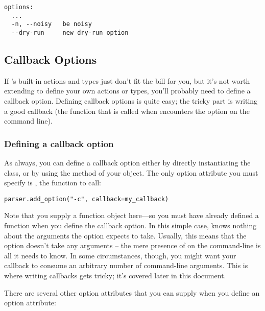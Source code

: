 \begin{verbatim}
options:
  ...
  -n, --noisy   be noisy
  --dry-run     new dry-run option
\end{verbatim}

\subsection{Callback Options\label{optparse-callback-options}}

If 's built-in actions and types just don't fit the
bill for you, but it's not worth extending  to define
your own actions or types, you'll probably need to define a callback
option.  Defining callback options is quite easy; the tricky part is
writing a good callback (the function that is called when
 encounters the option on the command line).

\subsubsection{Defining a callback option\label{optparse-defining-callback-option}}

As always, you can define a callback option either by directly
instantiating the  class, or by using the
 method of your  object. The
only option attribute you must specify is , the function
to call:

\begin{verbatim}
parser.add_option("-c", callback=my_callback)
\end{verbatim}

Note that you supply a function object here---so you must have
already defined a function  when you define
the callback option.  In this simple case,  knows
nothing about the arguments the  option expects to
take.  Usually, this means that the option doesn't take any arguments
-- the mere presence of  on the command-line is all it
needs to know.  In some circumstances, though, you might want your
callback to consume an arbitrary number of command-line arguments.
This is where writing callbacks gets tricky; it's covered later in
this document.

There are several other option attributes that you can supply when you
define an option attribute:

